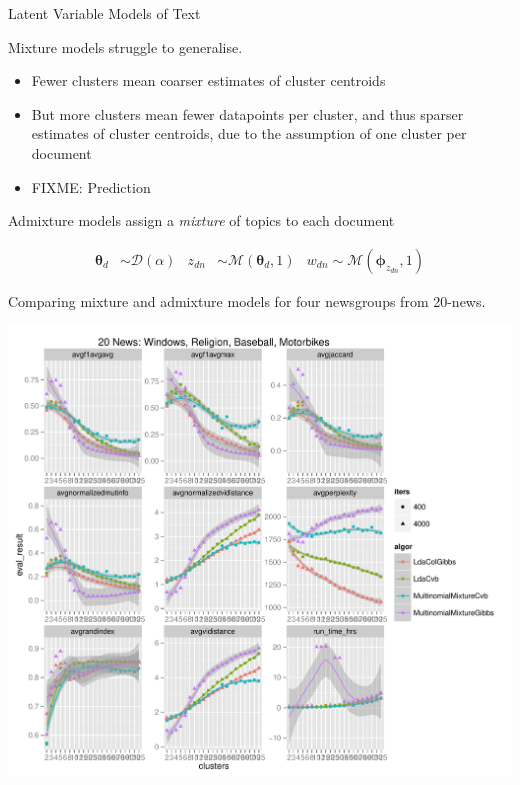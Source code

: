 \documentclass[xcolor=dvipsnames]{beamer}
\newcommand \fixme[1] {
    {\color{red} FIXME: #1}
}
\newcommand \vv[1] { \boldsymbol #1 }
\newcommand \mul[1]   { \mathcal{M} \left( {#1} \right) }
\newcommand \muln[2]  { \mathcal{M} \left( {#1},{#2} \right) }
\newcommand \dir[1]   { \mathcal{D} \left( {#1} \right) }
\newcommand \dir[1]   { \mathcal{D} \left( {#1} \right) }
\begin{document}
\begin{frame}{Latent Variable Models of Text}
 {
Mixture models struggle to generalise.
\begin{itemize}
    \item Fewer clusters mean coarser estimates of cluster centroids
    \item But more clusters mean fewer datapoints per cluster, and thus sparser estimates of cluster centroids, due to the assumption of one cluster per document
    \item \fixme{Prediction}
\end{itemize}
}



 {
Admixture models assign a \emph{mixture} of topics to each document\cite{BleiNgJordan2003} 

\begin{align*}
\vv{\theta}_d & \sim \dir{\alpha} & z_{dn} & \sim \muln{\vv{\theta}_d}{1} & w_{dn} \sim \mul{\vv{\phi}_{z_{dn}},1}
\end{align*}

}

 {
    \begin{figure}[t]
    \centering
    \resizebox{6cm}{!}{
        
    }
    \end{figure}
}

 {
    Comparing mixture and admixture models for four newsgroups from 20-news.

    \includegraphics[trim=12.3cm 7.3cm 0.5cm 7.7cm, clip=true, totalwidth=0.8\textwidth]{Images/20news-2013-03-25.pdf}
}


\end{frame}
\end{document}
